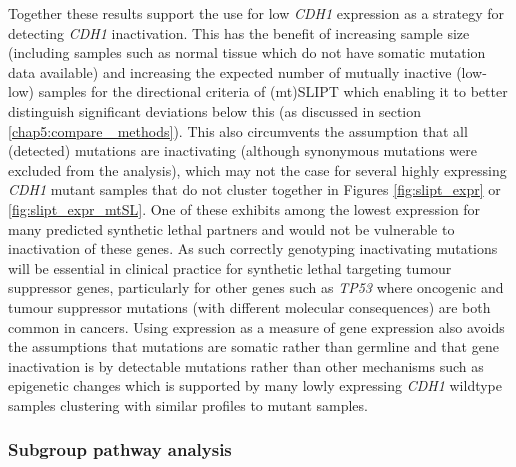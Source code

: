 Together these results support the use for low \textit{CDH1} expression as a strategy for detecting \textit{CDH1} inactivation. This has the benefit of increasing sample size (including samples such as normal tissue which do not have somatic mutation data available) and increasing the expected number of mutually inactive (low-low) samples for the directional criteria of (mt)SLIPT which enabling it to better distinguish significant deviations below this (as discussed in section \ref{chap5:compare_ methods}). This also circumvents the assumption that all (detected) mutations are inactivating (although synonymous mutations were excluded from the analysis), which may not the case for several highly expressing \textit{CDH1} mutant samples that do not cluster together in Figures \ref{fig:slipt_expr} or \ref{fig:slipt_expr_mtSL}. One of these exhibits among the lowest expression for many predicted synthetic lethal partners and would not be vulnerable to inactivation of these genes. As such correctly genotyping inactivating mutations will be essential in clinical practice for synthetic lethal targeting tumour suppressor genes, particularly for other genes such as \textit{TP53} where oncogenic and tumour suppressor mutations (with different molecular consequences) are both common in cancers. Using expression as a measure of gene expression also avoids the assumptions that mutations are somatic rather than germline and that gene inactivation is by detectable mutations rather than other mechanisms such as epigenetic changes which is supported by many lowly expressing \textit{CDH1} wildtype samples clustering with similar profiles to mutant samples.



\FloatBarrier

\subsubsection{Subgroup pathway analysis}



